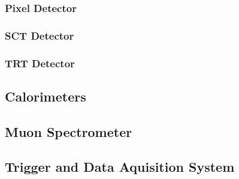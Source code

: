 \subsubsection{Pixel Detector}
\subsubsection{SCT Detector}
\subsubsection{TRT Detector}
\subsection{Calorimeters}
\subsection{Muon Spectrometer}
\subsection{Trigger and Data Aquisition System}